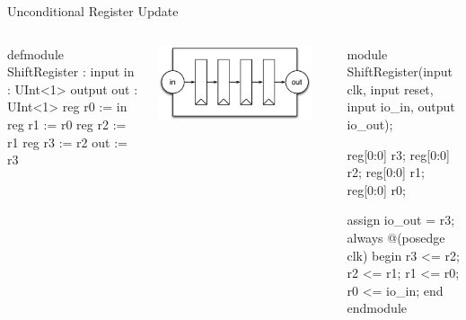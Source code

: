 \documentclass[xcolor=pdflatex,dvipsnames,table]{beamer}
\begin{document}
\begin{frame}[fragile]{Unconditional Register Update}

\begin{columns}


{
\begin{stanza}
defmodule ShiftRegister :
  input in : UInt<1>
  output out : UInt<1>
  reg r0 := in
  reg r1 := r0
  reg r2 := r1
  reg r3 := r2
  out := r3
\end{stanza}
}
\begin{center}
\includegraphics[width=0.9\textwidth]{figs/shift-register.pdf}
\end{center}


{
\begin{stanza}
module ShiftRegister(input clk, input reset,
    input  io_in,
    output io_out);

  reg[0:0] r3;
  reg[0:0] r2;
  reg[0:0] r1;
  reg[0:0] r0;

  assign io_out = r3;
  always @(posedge clk) begin
    r3 <= r2;
    r2 <= r1;
    r1 <= r0;
    r0 <= io_in;
  end
endmodule
\end{stanza}
}

\end{columns}

\end{frame}
\end{document}
